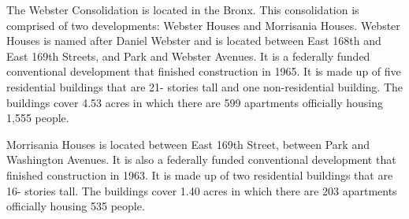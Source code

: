       

    

The Webster Consolidation is located in the Bronx. This consolidation is comprised of two developments: Webster Houses and Morrisania Houses. Webster Houses is named after Daniel Webster and is located between East 168th and East 169th Streets, and Park and Webster Avenues. It is a federally funded conventional development that finished construction in 1965. It is made up of five residential buildings that are 21- stories tall and one non-residential building. The buildings cover 4.53 acres in which there are 599 apartments officially housing 1,555 people.  

Morrisania Houses is located between East 169th Street, between Park and Washington Avenues. It is also a federally funded conventional development that finished construction in 1963.  It is made up of two residential buildings that are 16- stories tall. The buildings cover 1.40 acres in which there are 203 apartments officially housing 535 people.  